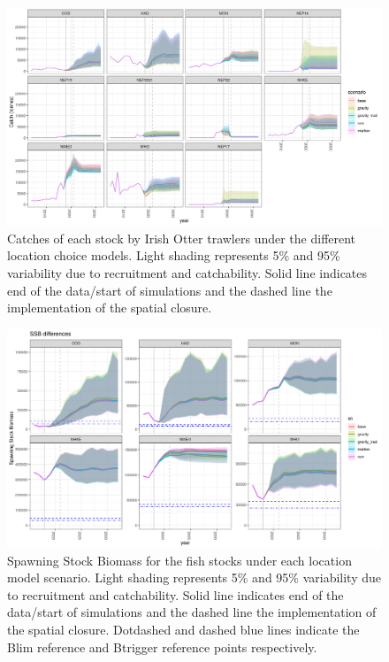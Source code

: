 \documentclass[12pt, halfline, a4paper]{ouparticle}
\begin{document}
\begin{figure}[!ht]
	\centering
	\includegraphics[width=1\linewidth]{figures/IE_Otter_catches}
	\caption{Catches of each stock by Irish Otter trawlers under the
		different location choice models. Light shading represents 5\%
		and 95\% variability due to recruitment and catchability. Solid
		line indicates end of the data/start of simulations and the
		dashed line the implementation of the spatial closure.} 
	\label{fig:OtterC}
\end{figure}	

\begin{figure}[!ht]
	\centering
	\includegraphics[width=1\linewidth]{figures/SSB_difference}
	\caption{Spawning Stock Biomass for the fish stocks under each location
		model scenario. Light shading represents 5\% and 95\%
		variability due to recruitment and catchability. Solid line
		indicates end of the data/start of simulations and the dashed
		line the implementation of the spatial closure.  Dotdashed and
		dashed blue lines indicate the Blim reference and Btrigger
		reference points respectively.} 
	\label{fig:SSB}
\end{figure}	
\end{document}
